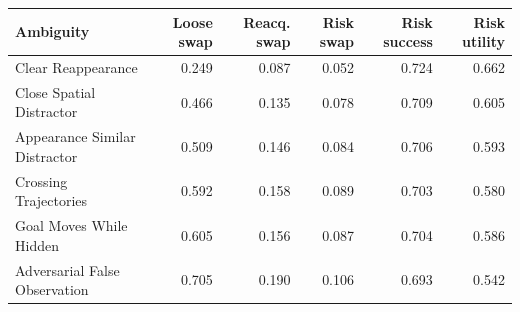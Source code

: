\begin{tabular}{lrrrrr}
\toprule
Ambiguity & Loose swap & Reacq. swap & Risk swap & Risk success & Risk utility \\
\midrule
Clear Reappearance & 0.249 & 0.087 & 0.052 & 0.724 & 0.662 \\
Close Spatial Distractor & 0.466 & 0.135 & 0.078 & 0.709 & 0.605 \\
Appearance Similar Distractor & 0.509 & 0.146 & 0.084 & 0.706 & 0.593 \\
Crossing Trajectories & 0.592 & 0.158 & 0.089 & 0.703 & 0.580 \\
Goal Moves While Hidden & 0.605 & 0.156 & 0.087 & 0.704 & 0.586 \\
Adversarial False Observation & 0.705 & 0.190 & 0.106 & 0.693 & 0.542 \\
\bottomrule
\end{tabular}
